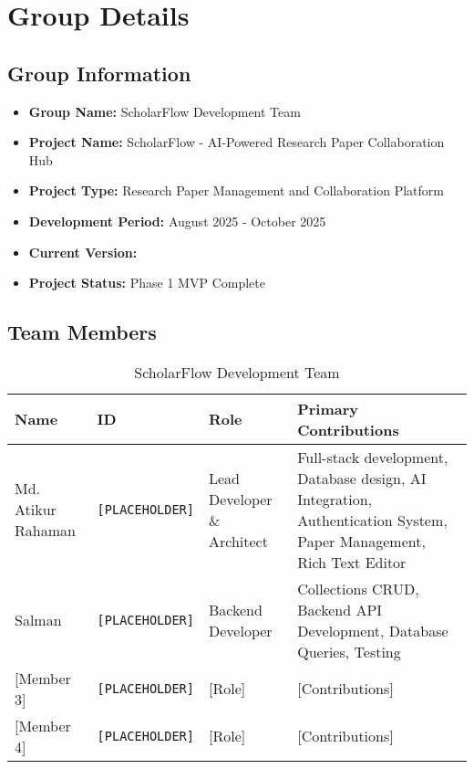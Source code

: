 \chapter{Group Details}
\label{ch:group-details}

\section{Group Information}
\label{sec:group-info}

\begin{infobox}
\begin{itemize}[leftmargin=*]
    \item \textbf{Group Name:} ScholarFlow Development Team
    \item \textbf{Project Name:} ScholarFlow - AI-Powered Research Paper Collaboration Hub
    \item \textbf{Project Type:} Research Paper Management and Collaboration Platform
    \item \textbf{Development Period:} August 2025 - October 2025
    \item \textbf{Current Version:} \version{}
    \item \textbf{Project Status:} Phase 1 MVP Complete \checkmark
\end{itemize}
\end{infobox}

\section{Team Members}
\label{sec:team-members}

\begin{table}[H]
\centering
\caption{ScholarFlow Development Team}
\label{tab:team-members}
\begin{tabular}{@{}lllp{6cm}@{}}
\toprule
\textbf{Name} & \textbf{ID} & \textbf{Role} & \textbf{Primary Contributions} \\
\midrule
Md. Atikur Rahaman & \texttt{[PLACEHOLDER]} & Lead Developer \& Architect & 
Full-stack development, Database design, AI Integration, Authentication System, Paper Management, Rich Text Editor \\
\addlinespace
Salman & \texttt{[PLACEHOLDER]} & Backend Developer & 
Collections CRUD, Backend API Development, Database Queries, Testing \\
\addlinespace
{[Member 3]} & \texttt{[PLACEHOLDER]} & {[Role]} & 
{[Contributions]} \\
\addlinespace
{[Member 4]} & \texttt{[PLACEHOLDER]} & {[Role]} & 
{[Contributions]} \\
\bottomrule
\end{tabular}
\end{table}

